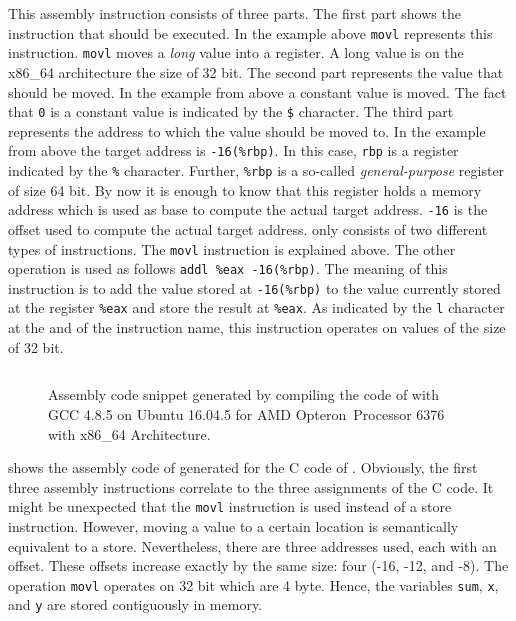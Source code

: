 \documentclass[onecolumn, openright, master, english, signatures]{dbrgrptt}
\begin{document}
This assembly instruction consists of three parts.
The first part shows the instruction that should be executed.
In the example above \texttt{movl} represents this instruction.
\texttt{movl} moves a \emph{long} value into a register.
A long value is on the x86\_64 architecture the size of 32 bit.
The second part represents the value that should be moved.
In the example from above a constant value is moved.
The fact that \texttt{0} is a constant value is indicated by the \texttt{\$} character.
The third part represents the address to which the value should be moved to.
In the example from above the target address is \texttt{-16(\%rbp)}.
In this case, \texttt{rbp} is a register indicated by the \texttt{\%} character.
Further, \texttt{\%rbp} is a so-called \emph{general-purpose} register of size 64 bit.
By now it is enough to know that this register holds a memory address which is used as base to compute the actual target address.
\texttt{-16} is the offset used to compute the actual target address.
 only consists of two different types of instructions.
The \texttt{movl} instruction is explained above.
The other operation is used as follows \texttt{addl \%eax -16(\%rbp)}.
The meaning of this instruction is to add the value stored at \texttt{-16(\%rbp)} to the value currently stored at the register \texttt{\%eax} and store the result at \texttt{\%eax}.
As indicated by the \texttt{l} character at the and of the instruction name, this instruction operates on values of the size of 32 bit.

\begin{figure}[!ht]
  \centering
  \begin{tabular}{c}
  
  \end{tabular}
  \caption{Assembly code snippet generated by compiling the code of  with GCC 4.8.5 on Ubuntu 16.04.5 for AMD Opteron\texttrademark~Processor 6376 with x86\_64 Architecture.}
  \label{fig:mat-example-assembly-code}
\end{figure}

 shows the assembly code of generated for the C code of .
Obviously, the first three assembly instructions correlate to the three assignments of the C code.
It might be unexpected that the \texttt{movl} instruction is used instead of a store instruction.
However, moving a value to a certain location is semantically equivalent to a store.
Nevertheless, there are three addresses used, each with an offset.
These offsets increase exactly by the same size: four (-16, -12, and -8).
The operation \texttt{movl} operates on 32 bit which are 4 byte.
Hence, the variables \texttt{sum}, \texttt{x}, and \texttt{y} are stored contiguously in memory.
\end{document}
